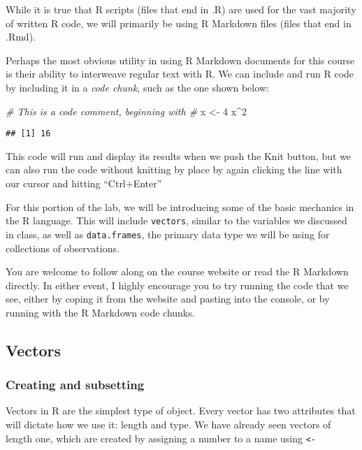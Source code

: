 \documentclass[
]{article}
\newenvironment{Shaded}{\begin{snugshade}}{\end{snugshade}}
\newcommand{\CommentTok}[1]{\textcolor[rgb]{0.56,0.35,0.01}{\textit{#1}}}
\newcommand{\DecValTok}[1]{\textcolor[rgb]{0.00,0.00,0.81}{#1}}
\newcommand{\NormalTok}[1]{#1}
\newcommand{\OtherTok}[1]{\textcolor[rgb]{0.56,0.35,0.01}{#1}}
\newcommand{\SpecialCharTok}[1]{\textcolor[rgb]{0.81,0.36,0.00}{\textbf{#1}}}
\begin{document}
While it is true that R scripts (files that end in .R) are used for the
vast majority of written R code, we will primarily be using R Markdown
files (files that end in .Rmd).

Perhaps the most obvious utility in using R Markdown documents for this
course is their ability to interweave regular text with R. We can
include and run R code by including it in a \emph{code chunk}, such as
the one shown below:

\begin{Shaded}
\begin{Highlighting}[]
\CommentTok{\# This is a code comment, beginning with \#}
\NormalTok{x }\OtherTok{\textless{}{-}} \DecValTok{4} 
\NormalTok{x}\SpecialCharTok{\^{}}\DecValTok{2}
\end{Highlighting}
\end{Shaded}

\begin{verbatim}
## [1] 16
\end{verbatim}

This code will run and display its results when we push the Knit button,
but we can also run the code without knitting by place by again clicking
the line with our cursor and hitting ``Ctrl+Enter''

For this portion of the lab, we will be introducing some of the basic
mechanics in the R language. This will include \texttt{vectors}, similar
to the variables we discussed in class, as well as \texttt{data.frames},
the primary data type we will be using for collections of observations.

You are welcome to follow along on the course website or read the R
Markdown directly. In either event, I highly encourage you to try
running the code that we see, either by coping it from the website and
pasting into the console, or by running with the R Markdown code chunks.

\subsection{Vectors}\label{vectors}

\subsubsection{Creating and subsetting}\label{creating-and-subsetting}

Vectors in R are the simplest type of object. Every vector has two
attributes that will dictate how we use it: length and type. We have
already seen vectors of length one, which are created by assigning a
number to a name using \texttt{\textless{}-}
\end{document}
